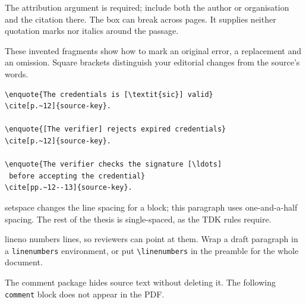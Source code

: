 The attribution argument is required; include both the author or organisation and the citation there. The box can break across pages. It supplies neither quotation marks nor italics around the passage.

These invented fragments show how to mark an original error, a replacement and an omission. Square brackets distinguish your editorial changes from the source's words.
\begin{verbatim}
\enquote{The credentials is [\textit{sic}] valid}
\cite[p.~12]{source-key}.

\enquote{[The verifier] rejects expired credentials}
\cite[p.~12]{source-key}.

\enquote{The verifier checks the signature [\ldots]
 before accepting the credential}
\cite[pp.~12--13]{source-key}.
\end{verbatim}

\begin{onehalfspace}
setspace changes the line spacing for a block; this paragraph uses one-and-a-half spacing.
The rest of the thesis is single-spaced, as the TDK rules require.
\end{onehalfspace}

\begin{linenumbers}
lineno numbers lines, so reviewers can point at them.
Wrap a draft paragraph in a \texttt{linenumbers} environment, or put \texttt{\textbackslash linenumbers} in the preamble for the whole document.
\end{linenumbers}

The comment package hides source text without deleting it. The following \texttt{comment} block does not appear in the PDF.


